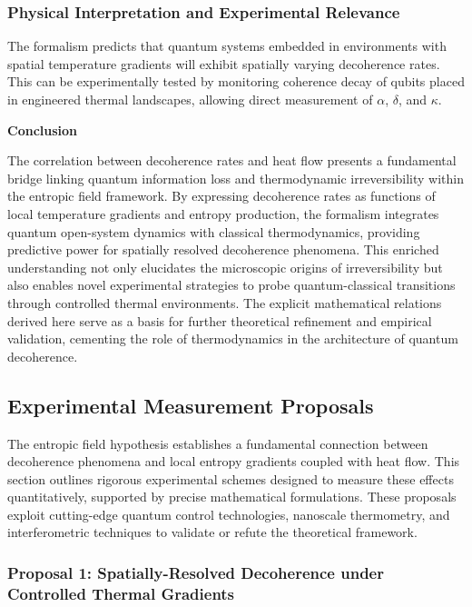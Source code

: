 \documentclass[12pt]{article}
\begin{document}
\subsubsection*{Physical Interpretation and Experimental Relevance}

The formalism predicts that quantum systems embedded in environments with spatial temperature gradients will exhibit spatially varying decoherence rates. This can be experimentally tested by monitoring coherence decay of qubits placed in engineered thermal landscapes, allowing direct measurement of \(\alpha\), \(\delta\), and \(\kappa\).

\bigskip

\noindent
\textbf{Conclusion}

The correlation between decoherence rates and heat flow presents a fundamental bridge linking quantum information loss and thermodynamic irreversibility within the entropic field framework. By expressing decoherence rates as functions of local temperature gradients and entropy production, the formalism integrates quantum open-system dynamics with classical thermodynamics, providing predictive power for spatially resolved decoherence phenomena. This enriched understanding not only elucidates the microscopic origins of irreversibility but also enables novel experimental strategies to probe quantum-classical transitions through controlled thermal environments. The explicit mathematical relations derived here serve as a basis for further theoretical refinement and empirical validation, cementing the role of thermodynamics in the architecture of quantum decoherence.


\subsection{Experimental Measurement Proposals}

The entropic field hypothesis establishes a fundamental connection between decoherence phenomena and local entropy gradients coupled with heat flow. This section outlines rigorous experimental schemes designed to measure these effects quantitatively, supported by precise mathematical formulations. These proposals exploit cutting-edge quantum control technologies, nanoscale thermometry, and interferometric techniques to validate or refute the theoretical framework.

\subsubsection*{Proposal 1: Spatially-Resolved Decoherence under Controlled Thermal Gradients}
\end{document}
